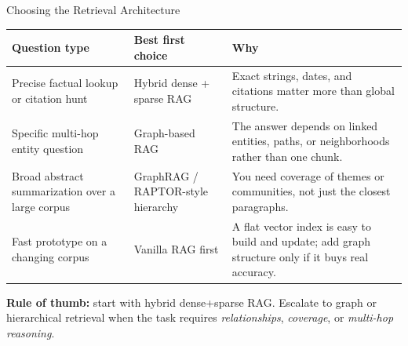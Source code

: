 \documentclass[10pt,english,aspectratio=169]{beamer}
\begin{document}
\begin{frame}{Choosing the Retrieval Architecture}
\begin{center}
\renewcommand{\arraystretch}{1.25}
\small
\begin{tabular}{|p{3.2cm}|p{3.1cm}|p{5.8cm}|}
\hline
\textbf{Question type} & \textbf{Best first choice} & \textbf{Why} \\
\hline
Precise factual lookup or citation hunt & Hybrid dense + sparse RAG & Exact strings, dates, and citations matter more than global structure. \\
\hline
Specific multi-hop entity question & Graph-based RAG & The answer depends on linked entities, paths, or neighborhoods rather than one chunk. \\
\hline
Broad abstract summarization over a large corpus & GraphRAG / RAPTOR-style hierarchy & You need coverage of themes or communities, not just the closest paragraphs. \\
\hline
Fast prototype on a changing corpus & Vanilla RAG first & A flat vector index is easy to build and update; add graph structure only if it buys real accuracy. \\
\hline
\end{tabular}
\end{center}

\bigskip
\textbf{Rule of thumb:} start with hybrid dense+sparse RAG. Escalate to graph or hierarchical retrieval when the task requires \emph{relationships}, \emph{coverage}, or \emph{multi-hop reasoning}.
\end{frame}
\end{document}
